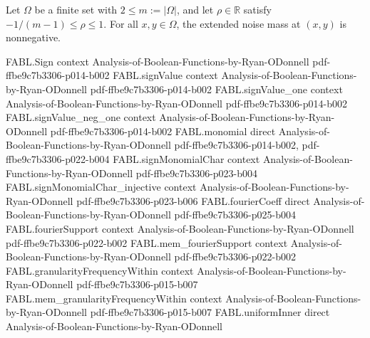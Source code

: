 \begin{theorem}
\label{FABL.uniformExtendedNoiseMass_nonneg}
\leanok
{}
Let $\Omega$ be a finite set with $2\leq m:=|\Omega|$, and let $\rho\in\mathbb{R}$
satisfy $-1/(m-1)\leq\rho\leq1$. For all $x,y\in\Omega$, the extended noise mass at
$(x,y)$ is nonnegative.
\end{theorem}

\begin{theorem}
\label{FABL.sum_uniformExtendedNoiseMass}
\leanok
{}
\proofstep
  {FABL.Sign}
  {context}
  {Analysis-of-Boolean-Functions-by-Ryan-ODonnell}
  {pdf-ffbe9c7b3306-p014-b002}
\proofstep
  {FABL.signValue}
  {context}
  {Analysis-of-Boolean-Functions-by-Ryan-ODonnell}
  {pdf-ffbe9c7b3306-p014-b002}
\proofstep
  {FABL.signValue_one}
  {context}
  {Analysis-of-Boolean-Functions-by-Ryan-ODonnell}
  {pdf-ffbe9c7b3306-p014-b002}
\proofstep
  {FABL.signValue_neg_one}
  {context}
  {Analysis-of-Boolean-Functions-by-Ryan-ODonnell}
  {pdf-ffbe9c7b3306-p014-b002}
\proofstep
  {FABL.monomial}
  {direct}
  {Analysis-of-Boolean-Functions-by-Ryan-ODonnell}
  {pdf-ffbe9c7b3306-p014-b002,
    pdf-ffbe9c7b3306-p022-b004}
\proofstep
  {FABL.signMonomialChar}
  {context}
  {Analysis-of-Boolean-Functions-by-Ryan-ODonnell}
  {pdf-ffbe9c7b3306-p023-b004}
\proofstep
  {FABL.signMonomialChar_injective}
  {context}
  {Analysis-of-Boolean-Functions-by-Ryan-ODonnell}
  {pdf-ffbe9c7b3306-p023-b006}
\proofstep
  {FABL.fourierCoeff}
  {direct}
  {Analysis-of-Boolean-Functions-by-Ryan-ODonnell}
  {pdf-ffbe9c7b3306-p025-b004}
\proofstep
  {FABL.fourierSupport}
  {context}
  {Analysis-of-Boolean-Functions-by-Ryan-ODonnell}
  {pdf-ffbe9c7b3306-p022-b002}
\proofstep
  {FABL.mem_fourierSupport}
  {context}
  {Analysis-of-Boolean-Functions-by-Ryan-ODonnell}
  {pdf-ffbe9c7b3306-p022-b002}
\proofstep
  {FABL.granularityFrequencyWithin}
  {context}
  {Analysis-of-Boolean-Functions-by-Ryan-ODonnell}
  {pdf-ffbe9c7b3306-p015-b007}
\proofstep
  {FABL.mem_granularityFrequencyWithin}
  {context}
  {Analysis-of-Boolean-Functions-by-Ryan-ODonnell}
  {pdf-ffbe9c7b3306-p015-b007}
\proofstep
  {FABL.uniformInner}
  {direct}
  {Analysis-of-Boolean-Functions-by-Ryan-ODonnell}

\end{theorem}
